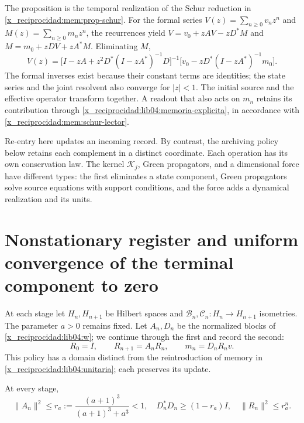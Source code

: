 The proposition is the temporal realization of the Schur reduction in
\cref{x_reciprocidad:mem:prop-schur}. For the formal series
\(V(z)=\sum_{n\geq0}v_nz^n\) and
\(M(z)=\sum_{n\geq0}m_nz^n\), the recurrences yield
\(V=v_0+zAV-zD^*M\) and \(M=m_0+zDV+zA^*M\). Eliminating \(M\),
\begin{equation}
 V(z)=\bigl[I-zA+z^2D^*(I-zA^*)^{-1}D\bigr]^{-1}
       \bigl[v_0-zD^*(I-zA^*)^{-1}m_0\bigr].
 \label{x_reciprocidad:lib04:schur-bilateral}
\end{equation}
The formal inverses exist because their constant terms are identities;
the state series and the joint resolvent also converge for \(|z|<1\).
The initial source and the effective operator transform together. A readout
that also acts on \(m_n\) retains its contribution through
\eqref{x_reciprocidad:lib04:memoria-explicita}, in accordance with \eqref{x_reciprocidad:mem:schur-lector}.

Re-entry here updates an incoming record. By contrast, the archiving policy
below retains each complement in a distinct coordinate. Each operation has
its own conservation law. The kernel \(\mathscr K_j\), Green propagators,
and a dimensional force have different types: the first eliminates a state
component, Green propagators solve source equations with support conditions, and
the force adds a dynamical realization and its units.



\section{Nonstationary register and uniform convergence of the terminal component to zero}
\label{x_reciprocidad:lib04:archivo}

At each stage let \(H_n,H_{n+1}\) be Hilbert spaces and
\(\mathcal B_n,\mathcal C_n:H_n\to H_{n+1}\) isometries. The
parameter \(a>0\) remains fixed. Let \(A_n,D_n\) be the normalized
blocks of \eqref{x_reciprocidad:lib04:w}; we continue through the first and
record the second:
\begin{equation}
 R_0=I,\qquad R_{n+1}=A_nR_n,\qquad m_n=D_nR_nv.
 \label{x_reciprocidad:lib04:politica-archivo}
\end{equation}
This policy has a domain distinct from the reintroduction of
memory in \eqref{x_reciprocidad:lib04:unitaria}; each preserves its update.

\begin{lemma}
\label{x_reciprocidad:lib04:lem-tasa}
At every stage,
\begin{equation}
 \|A_n\|^2\leq r_a:={\frac{(a+1)^3}{(a+1)^3+a^3}}<1,
 \quad D_n^*D_n\geq(1-r_a)I,
 \quad\|R_n\|^2\leq r_a^n.
 \label{x_reciprocidad:lib04:tasa}
\end{equation}
\end{lemma}

